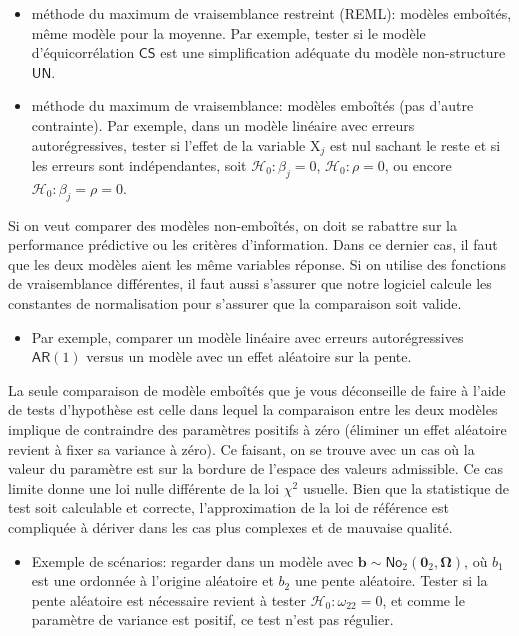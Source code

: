 \documentclass[
  11pt,
  letterpaper,
]{article}
\providecommand{\tightlist}{%
  \setlength{\itemsep}{0pt}\setlength{\parskip}{0pt}}
\theoremstyle{definition}
\theoremstyle{definition}
\theoremstyle{definition}
\theoremstyle{definition}
\theoremstyle{remark}
\begin{document}
\begin{itemize}
\tightlist
\item
  méthode du maximum de vraisemblance restreint (REML): modèles emboîtés, même modèle pour la moyenne. Par exemple, tester si le modèle d'équicorrélation \(\mathsf{CS}\) est une simplification adéquate du modèle non-structure \(\mathsf{UN}\).
\item
  méthode du maximum de vraisemblance: modèles emboîtés (pas d'autre contrainte). Par exemple, dans un modèle linéaire avec erreurs autorégressives, tester si l'effet de la variable \(\mathrm{X}_j\) est nul sachant le reste et si les erreurs sont indépendantes, soit \(\mathscr{H}_0: \beta_j=0\), \(\mathscr{H}_0: \rho=0\), ou encore \(\mathscr{H}_0: \beta_j=\rho=0\).
\end{itemize}

Si on veut comparer des modèles non-emboîtés, on doit se rabattre sur la performance prédictive ou les critères d'information. Dans ce dernier cas, il faut que les deux modèles aient les même variables réponse. Si on utilise des fonctions de vraisemblance différentes, il faut aussi s'assurer que notre logiciel calcule les constantes de normalisation pour s'assurer que la comparaison soit valide.

\begin{itemize}
\tightlist
\item
  Par exemple, comparer un modèle linéaire avec erreurs autorégressives \(\mathsf{AR}(1)\) versus un modèle avec un effet aléatoire sur la pente.
\end{itemize}

La seule comparaison de modèle emboîtés que je vous déconseille de faire à l'aide de tests d'hypothèse est celle dans lequel la comparaison entre les deux modèles implique de contraindre des paramètres positifs à zéro (éliminer un effet aléatoire revient à fixer sa variance à zéro). Ce faisant, on se trouve avec un cas où la valeur du paramètre est sur la bordure de l'espace des valeurs admissible. Ce cas limite donne une loi nulle différente de la loi \(\chi^2\) usuelle. Bien que la statistique de test soit calculable et correcte, l'approximation de la loi de référence est compliquée à dériver dans les cas plus complexes et de mauvaise qualité.

\begin{itemize}
\tightlist
\item
  Exemple de scénarios: regarder dans un modèle avec \(\boldsymbol{b} \sim \mathsf{No}_2(\boldsymbol{0}_2, \boldsymbol{\Omega})\), où \(b_1\) est une ordonnée à l'origine aléatoire et \(b_2\) une pente aléatoire. Tester si la pente aléatoire est nécessaire revient à tester \(\mathscr{H}_0: \omega_{22}=0\), et comme le paramètre de variance est positif, ce test n'est pas régulier.
\end{itemize}
\end{document}

